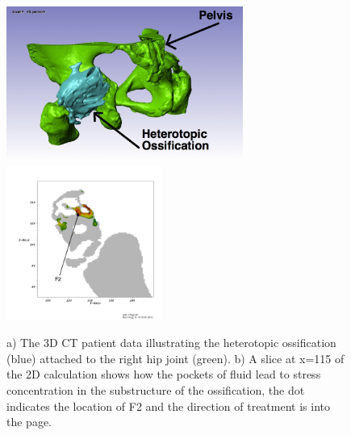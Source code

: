 \documentclass{article}
\begin{document}
\begin{figure}[h!]
\begin{center}
\includegraphics[height=2in]{ossification/hip_ho_annotated.jpg}\hspace{5mm}
\includegraphics[height=2in]{ossification/shear_hip_2D_1storder_annotate_F2.png}
\caption{a) The 3D CT patient data illustrating the heterotopic ossification (blue) attached to the right hip joint (green).  b) A slice at x=115 of the 2D calculation shows how the pockets of fluid lead to stress concentration in the substructure of the ossification, the dot indicates the location of F2 and the direction of treatment is into the page.}
\label{fig:real_ho}
\end{center}
\end{figure}
\end{document}
